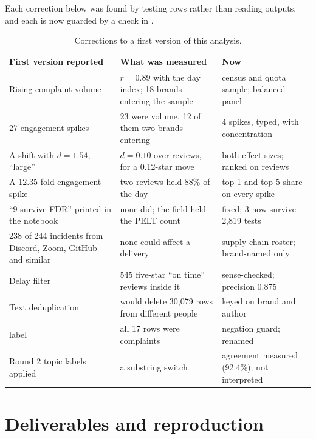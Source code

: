 \documentclass[11pt,a4paper]{article}
\newcommand{\code}[1]{\texttt{\detokenize{#1}}}
\begin{document}
Each correction below was found by testing rows rather than reading outputs, and each is now guarded by a check in \code{src/preflight.py}.

\begin{table}[htbp]\centering\small
\caption{Corrections to a first version of this analysis.}\label{tab:corrections}
\begin{tabularx}{\linewidth}{@{}X X X@{}}
\toprule
First version reported & What was measured & Now\\
\midrule
Rising complaint volume & $r=0.89$ with the day index; 18 brands entering the sample & census and quota sample; balanced panel\\
27 engagement spikes & 23 were volume, 12 of them two brands entering & 4 spikes, typed, with concentration\\
A shift with $d=1.54$, ``large'' & $d=0.10$ over reviews, for a 0.12-star move & both effect sizes; ranked on reviews\\
A 12.35-fold engagement spike & two reviews held 88\% of the day & top-1 and top-5 share on every spike\\
``9 survive FDR'' printed in the notebook & none did; the field held the PELT count & fixed; 3 now survive 2,819 tests\\
238 of 244 incidents from Discord, Zoom, GitHub and similar & none could affect a delivery & supply-chain roster; brand-named only\\
Delay filter & 545 five-star ``on time'' reviews inside it & sense-checked; precision 0.875\\
Text deduplication & would delete 30,079 rows from different people & keyed on brand and author\\
\code{praise_recovery} label & all 17 rows were complaints & negation guard; renamed\\
Round 2 topic labels applied & a substring switch & agreement measured (92.4\%); not interpreted\\
\bottomrule
\end{tabularx}
\end{table}

\appendix
\section{Deliverables and reproduction}\label{sec:repro}
\end{document}
